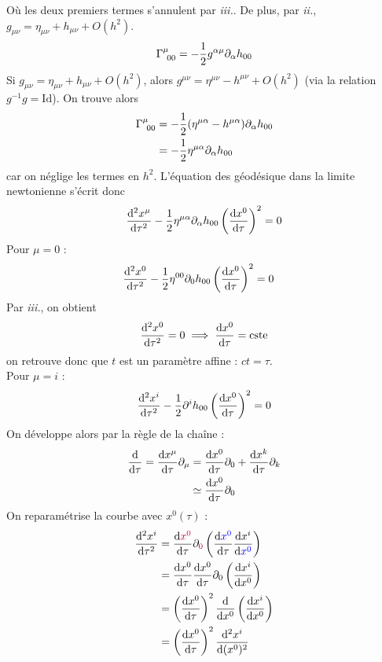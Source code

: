 Où les deux premiers termes s'annulent par \textit{iii.}. 
De plus, par \textit{ii.}, $g_{\mu \nu} = \eta_{\mu \nu} + h_{\mu \nu} + O(h^2)$.
\begin{equation}
    \Gamma\indices{^{\mu}_{\!0 0}} = - \frac{1}{2}g^{\alpha \mu}\partial_{\alpha}h_{00}
\end{equation}
Si $g_{\mu \nu} = \eta_{\mu \nu} + h_{\mu \nu} +O(h^2)$, alors $g^{\mu \nu} = \eta^{\mu \nu} - h^{\mu \nu } +O(h^2)$ (via la relation $g^{-1} g = \mathrm{Id}$). On trouve alors
\begin{align}
    \Gamma\indices{^{\mu}_{\!0 0}} &=-\frac{1}{2}(\eta^{\mu \alpha} - h^{\mu \alpha })\partial_{\alpha}h_{00}\\
    &= -\frac{1}{2}\eta^{\mu \alpha}\partial_{\alpha}h_{00}\\
\end{align}
car on néglige les termes en $h^2$. L'équation des géodésique dans la limite newtonienne s'écrit donc
\begin{equation}
     \frac{\mathrm{d}^2 x^{\mu}}{\mathrm{d} \tau^2} -\frac{1}{2}\eta^{\mu \alpha}\partial_{\alpha}h_{00}\left(\frac{\mathrm{d} x^{0}}{\mathrm{d} \tau}\right)^2 = 0
\end{equation}
Pour $\mu = 0$ :
\begin{align}
     &\frac{\mathrm{d} ^2x^{0}}{\mathrm{d} \tau^2} -\frac{1}{2}\eta^{00}\partial_{0}h_{00}\left(\frac{\mathrm{d} x^{0}}{\mathrm{d} \tau}\right)^2 = 0
\end{align}
Par \textit{iii.}, on obtient
\begin{equation}
    \frac{\mathrm{d} ^2x^{0}}{\mathrm{d} \tau^2} = 0 \implies \frac{\mathrm{d} x^{0}}{\mathrm{d} \tau} = \text{cste}
\end{equation}
on retrouve donc que $t$ est un paramètre affine : $ct = \tau$.\\
Pour $\mu = i$ :
\begin{align}
     \frac{\mathrm{d} ^2x^{i}}{\mathrm{d} \tau^2} -\frac{1}{2}\partial^{i}h_{00}\left(\frac{\mathrm{d} x^{0}}{\mathrm{d} \tau}\right)^2 = 0
\end{align}
On développe alors par la règle de la chaîne :
\begin{align}
    \frac{\mathrm{d} }{\mathrm{d} \tau} = \frac{\mathrm{d} x^{\mu}}{\mathrm{d} \tau} \partial_{\mu}& = \frac{\mathrm{d} x^{0}}{\mathrm{d} \tau} \partial_{0} + \frac{\mathrm{d} x^{k}}{\mathrm{d} \tau} \partial_{k}\\
    & \simeq \frac{\mathrm{d} x^{0}}{\mathrm{d} \tau} \partial_{0}
\end{align}
On reparamétrise la courbe avec $x^0(\tau)$ :
\begin{align}
     \frac{\mathrm{d}^2 x^{i}}{\mathrm{d} \tau^2} &= \frac{\mathrm{d} \textcolor{purple}{x^{0}}}{\mathrm{d} \tau} \partial_{\textcolor{purple}{0}}\left( \frac{\mathrm{d} \textcolor{blue}{x^{0}}}{\mathrm{d} \tau} \frac{\mathrm{d} x^{i}}{\mathrm{d} \textcolor{blue}{x^0}}\right)\\
     &=\frac{\mathrm{d} x^{0}}{\mathrm{d} \tau} \frac{\mathrm{d} x^{0}}{\mathrm{d} \tau}\partial_{0}\left(\frac{\mathrm{d} x^{i}}{\mathrm{d} x^0}\right) \\
     &=\left(\frac{\mathrm{d} x^{0}}{\mathrm{d} \tau}\right)^2 \frac{\mathrm{d} }{\mathrm{d} x^0}\left(\frac{\mathrm{d} x^{i}}{\mathrm{d} x^0}\right)\\
     &=\left(\frac{\mathrm{d} x^{0}}{\mathrm{d} \tau}\right)^2 \frac{\mathrm{d} ^2 x^{i}}{\mathrm{d} (x^0)^2}
\end{align}
